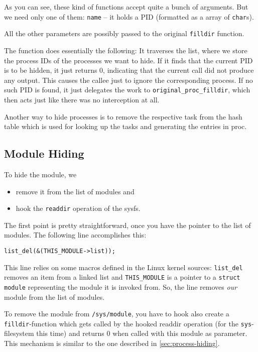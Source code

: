 \documentclass[10pt, letterpaper]{scrartcl}
\begin{document}
As you can see, these kind of functions accept quite a bunch of arguments. But we need only one of them: \texttt{name} -- it holds a PID (formatted as a array of \texttt{char}s). 

All the other parameters are possibly passed to the original \texttt{filldir} function.

The function does essentially the following: It traverses the list, where we store the process IDs of the processes we want to hide. If it finds that the current PID is to be hidden, it just returns 0, indicating that the current call did not produce any output. This causes the callee just to ignore the corresponding process. If no such PID is found, it just delegates the work to \texttt{original\_proc\_filldir}, which then acts just like there was no interception at all.

Another way to hide processes is to remove the respective task from the hash table which is used for looking up the tasks and generating the entries in proc.

\subsection{Module Hiding}
\label{sec:module_hiding}

To hide the module, we 
\begin{itemize}
 \item remove it from the list of modules and
 \item hook the \texttt{readdir} operation of the sysfs.
\end{itemize}

The first point is pretty straightforward, once you have the pointer to the list of modules. The following line accomplishes this:

\begin{verbatim}
list_del(&(THIS_MODULE->list));
\end{verbatim}

This line relies on some macros defined in the Linux kernel sources: \texttt{list\_del} removes an item from a linked list and \texttt{THIS\_MODULE} is a pointer to a \texttt{struct module} representing the module it is invoked from. So, the line removes \emph{our} module from the list of modules.

To remove the module from \texttt{/sys/module}, you have to hook also create a \texttt{filldir}-function which gets called by the hooked readdir operation (for the \texttt{sys}-filesystem this time) and returns 0 when called with this module as parameter. This mechanism is similar to the one described in \autoref{sec:process-hiding}.
\end{document}
